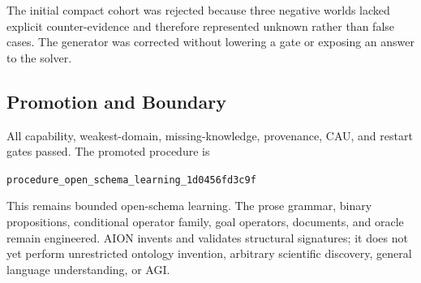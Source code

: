 The initial compact cohort was rejected because three negative worlds lacked
explicit counter-evidence and therefore represented unknown rather than false
cases.  The generator was corrected without lowering a gate or exposing an
answer to the solver.

\subsection{Promotion and Boundary}

All capability, weakest-domain, missing-knowledge, provenance, CAU, and
restart gates passed.  The promoted procedure is
\begin{center}
\small\texttt{procedure\_open\_schema\_learning\_1d0456fd3c9f}
\end{center}

This remains bounded open-schema learning.  The prose grammar, binary
propositions, conditional operator family, goal operators, documents, and
oracle remain engineered.  AION invents and validates structural signatures;
it does not yet perform unrestricted ontology invention, arbitrary scientific
discovery, general language understanding, or AGI.
